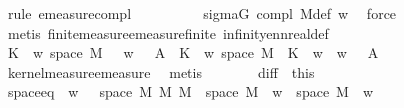 \begin{isabellebody}
\ {\isacharparenleft}{\kern0pt}rule\ emeasure{\isacharunderscore}{\kern0pt}compl{\isacharparenright}{\kern0pt}\isanewline
\ \ \ \ \ \ \ \ \isamarkupfalse%
\ sigma{\isacharunderscore}{\kern0pt}G\ compl\ M{}{\isacharunderscore}{\kern0pt}def\ w\ \isamarkupfalse%
\ force\isanewline
\ \ \ \ \ \ \ \ \isamarkupfalse%
\ {\isacharparenleft}{\kern0pt}metis\ finite{\isacharunderscore}{\kern0pt}measure{\isachardot}{\kern0pt}emeasure{\isacharunderscore}{\kern0pt}finite\ infinity{\isacharunderscore}{\kern0pt}ennreal{\isacharunderscore}{\kern0pt}def{\isacharparenright}{\kern0pt}\isanewline
\ \ \ \ \ \ \isamarkupfalse%
\ \isamarkupfalse%
\ {\isachardoublequoteopen}K\ {\isacharparenleft}{\kern0pt}{\isasymomega}\ w{\isacharparenright}{\kern0pt}\ {\isacharparenleft}{\kern0pt}space\ M{}\ {\isacharminus}{\kern0pt}\ {\isacharbraceleft}{\kern0pt}{\isasymomega}\ {\isacharparenleft}{\kern0pt}w{\isacharcomma}{\kern0pt}\ {\isasymomega}\ {\isasymin}\ A{\isacharbraceright}{\kern0pt}{\isacharparenright}{\kern0pt}\ {\isacharequal}{\kern0pt}\ K\ {\isacharparenleft}{\kern0pt}{\isasymomega}\ w{\isacharparenright}{\kern0pt}\ {\isacharparenleft}{\kern0pt}space\ M{}{\isacharparenright}{\kern0pt}\ {\isacharminus}{\kern0pt}\ K\ {\isacharparenleft}{\kern0pt}{\isasymomega}\ w{\isacharparenright}{\kern0pt}\ {\isacharbraceleft}{\kern0pt}{\isasymomega}\ {\isacharparenleft}{\kern0pt}w{\isacharcomma}{\kern0pt}\ {\isasymomega}\ {\isasymin}\ A{\isacharbraceright}{\kern0pt}{\isachardoublequoteclose}\isanewline
\ \ \ \ \ \ \ \ \isamarkupfalse%
\ kernel{\isacharunderscore}{\kern0pt}measure{\isacharunderscore}{\kern0pt}emeasure\ \isamarkupfalse%
\ metis\isanewline
\ \ \ \ \isacommand{{\isacharbraceright}{\kern0pt}}\isamarkupfalse%
\ \isamarkupfalse%
\ diff\ {\isacharequal}{\kern0pt}\ this\isanewline
\ \ \ \ \isamarkupfalse%
\ space{\isacharunderscore}{\kern0pt}eq{\isacharcolon}{\kern0pt}\ {\isachardoublequoteopen}{\isacharbraceleft}{\kern0pt}{\isasymomega}\ {\isacharparenleft}{\kern0pt}w{\isacharcomma}{\kern0pt}\ {\isasymomega}\ {\isasymin}\ space\ {\isacharparenleft}{\kern0pt}M{}\ {\isasymOtimes}\isactrlsub M\ M{}{\isacharparenright}{\kern0pt}{\isacharbraceright}{\kern0pt}\ {\isacharequal}{\kern0pt}\ space\ M{}{\isachardoublequoteclose}\ \ {\isachardoublequoteopen}w\ {\isasymin}\ space\ M{}{\isachardoublequoteclose}\ \ w\isanewline

\end{isabellebody}
